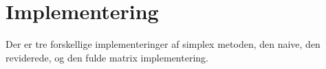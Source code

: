 %
\section{Implementering}
Der er tre forskellige implementeringer af simplex metoden, den naive, den reviderede, og den fulde matrix implementering. 

